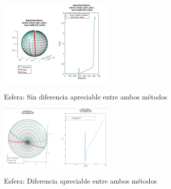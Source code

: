 \documentclass{endm}
\begin{document}
\begin{figure}[H]
\caption{Esfera: Sin diferencia apreciable entre ambos m\'etodos}
\centering
\includegraphics[width=0.5\textwidth]{esfera.jpg}
\label{fig:esfera}
\end{figure}

\begin{figure}[H]
\caption{Esfera: Diferencia apreciable entre ambos m\'etodos }
\centering
\includegraphics[width=0.5\textwidth]{esferarara.png}
\label{fig:esferamal}
\end{figure}


\tableofcontents
\end{document}
